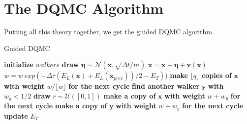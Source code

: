\documentclass [12pt]{report}
\begin{document}
\section{The DQMC Algorithm}
Putting all this theory together, we get the guided DQMC algorithm.

\begin{algorithm}
\caption{Guided DQMC}\label{dqmc}
\begin{algorithmic}[1]
\State \textbf{initialize} $walkers$
		\State \textbf{draw} $\bm{\eta} \sim \mathcal{N}(\bm{x},\sqrt{\Delta t/m})$
		\State $\bm{x} = \bm{x} + \bm{\eta} + \bm{v}(\bm{x})$ 
		\State $w = w \: exp(-\Delta \tau (E_L(\bm{x})+E_L(\bm{x}_{prev}))/2 - E_T))$
		\State \textbf{make} $\lfloor q \rfloor$ \textbf{copies of} $\bm{x}$ \textbf{with weight} $w/\lfloor w \rfloor$ \textbf{for the next cycle}
		\EndIf
		\State \textbf{find another walker} $\bm{y}$ \textbf{with} $w_y < 1/2$
		\State \textbf{draw} $r \sim \mathcal{U}([0,1])$
		\State \textbf{make a copy of} $\bm{x}$ \textbf{with weight} $w+w_y$ \textbf{for the next cycle}
		\Else
		\State \textbf{make a copy of} $\bm{y}$ \textbf{with weight} $w+w_y$ \textbf{for the next cycle}
		\EndIf
		\EndIf 
	\EndFor
	\State \textbf{update} $E_T$ 
\EndFor 
\EndProcedure
\end{algorithmic}
\end{algorithm}
\newpage
\end{document}
